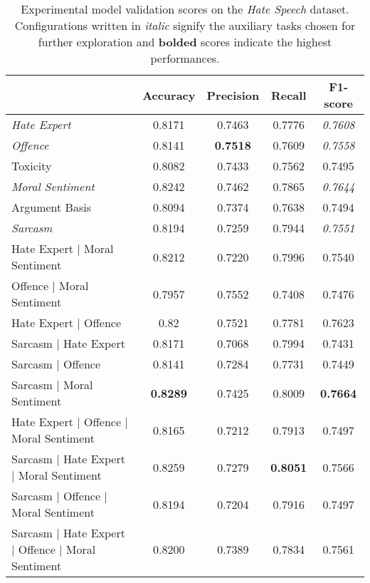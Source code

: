 \begin{table}[]
  \begin{tabular}{l|cccc}
                                                      & Accuracy        & Precision       & Recall          & F1-score        \\\hline
    \textit{Hate Expert}                              & 0.8171          & 0.7463          & 0.7776          & \textit{0.7608} \\
    \textit{Offence}                                  & 0.8141          & \textbf{0.7518} & 0.7609          & \textit{0.7558} \\
    Toxicity                                          & 0.8082          & 0.7433          & 0.7562          & 0.7495          \\
    \textit{Moral Sentiment}                          & 0.8242          & 0.7462          & 0.7865          & \textit{0.7644} \\
    Argument Basis                                    & 0.8094          & 0.7374          & 0.7638          & 0.7494          \\
    \textit{Sarcasm}                                  & 0.8194          & 0.7259          & 0.7944          & \textit{0.7551} \\\hline
    Hate Expert | Moral Sentiment                     & 0.8212          & 0.7220          & 0.7996          & 0.7540          \\
    Offence | Moral Sentiment                         & 0.7957          & 0.7552          & 0.7408          & 0.7476          \\
    Hate Expert | Offence                             & 0.82            & 0.7521          & 0.7781          & 0.7623          \\
    Sarcasm | Hate Expert                             & 0.8171          & 0.7068          & 0.7994          & 0.7431          \\
    Sarcasm | Offence                                 & 0.8141          & 0.7284          & 0.7731          & 0.7449          \\
    Sarcasm | Moral Sentiment                         & \textbf{0.8289} & 0.7425          & 0.8009          & \textbf{0.7664} \\
    Hate Expert | Offence | Moral Sentiment           & 0.8165          & 0.7212          & 0.7913          & 0.7497          \\
    Sarcasm | Hate Expert | Moral Sentiment           & 0.8259          & 0.7279          & \textbf{0.8051} & 0.7566          \\
    Sarcasm | Offence | Moral Sentiment               & 0.8194          & 0.7204          & 0.7916          & 0.7497          \\
    Sarcasm | Hate Expert | Offence | Moral Sentiment & 0.8200          & 0.7389          & 0.7834          & 0.7561
  \end{tabular}
  \caption{Experimental model validation scores on the \textit{Hate Speech} dataset. Configurations written in \textit{italic} signify the auxiliary tasks chosen for further exploration and \textbf{bolded} scores indicate the highest performances.}
  \label{tab:mtl_dev_wh}
\end{table}

